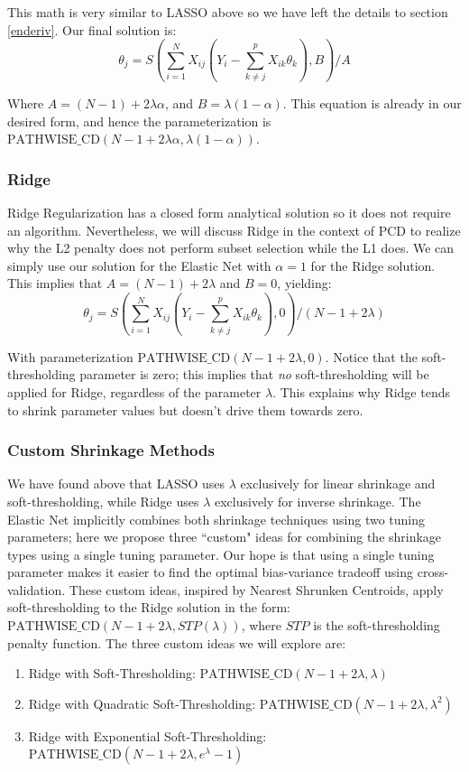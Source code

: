 \documentclass[11pt]{article}
\newcommand{\pcd}{\text{PATHWISE\_CD}}
\begin{document}
This math is very similar to LASSO above so we have left the details to section \ref{enderiv}.  Our final solution is:
	$$\theta_j = S\left(\sum\limits_{i=1}^N X_{ij}(Y_i - \sum\limits_{k \ne j}^p X_{ik}\theta_k), B\right)/A$$

Where $A=(N-1)+2\lambda\alpha$, and $B=\lambda(1-\alpha)$.  This equation is already in our desired form, and hence the parameterization is $\pcd(N-1+2\lambda\alpha,\lambda(1-\alpha))$.  

\subsubsection{Ridge}
Ridge Regularization has a closed form analytical solution so it does not require an algorithm.  Nevertheless, we will discuss Ridge in the context of PCD to realize why the L2 penalty does not perform subset selection while the L1 does.  We can simply use our solution for the Elastic Net with $\alpha=1$ for the Ridge solution.  This implies that $A=(N-1)+2\lambda$ and $B=0$, yielding:
	$$\theta_j = S\left(\sum\limits_{i=1}^N X_{ij}(Y_i - \sum\limits_{k \ne j}^p X_{ik}\theta_k), 0\right)/(N-1+2\lambda)$$

With parameterization $\pcd(N-1+2\lambda,0)$.  Notice that the soft-thresholding parameter is zero; this implies that \textit{no} soft-thresholding will be applied for Ridge, regardless of the parameter $\lambda$.  This explains why Ridge tends to shrink parameter values but doesn't drive them towards zero.  

\subsubsection{Custom Shrinkage Methods}
\label{csm}
We have found above that LASSO uses $\lambda$ exclusively for linear shrinkage and soft-thresholding, while Ridge uses $\lambda$ exclusively for inverse shrinkage.  The Elastic Net implicitly combines both shrinkage techniques using two tuning parameters; here we propose three ``custom" ideas for combining the shrinkage types using a single tuning parameter.  Our hope is that using a single tuning parameter makes it easier to find the optimal bias-variance tradeoff using cross-validation.  These custom ideas, inspired by Nearest Shrunken Centroids, apply soft-thresholding to the Ridge solution in the form: $\pcd(N-1 + 2\lambda, STP(\lambda))$, where $STP$ is the soft-thresholding penalty function.  The three custom ideas we will explore are:
\begin{enumerate}
	\item Ridge with Soft-Thresholding: $\pcd(N-1 + 2\lambda, \lambda)$
	\item Ridge with Quadratic Soft-Thresholding: $\pcd(N-1 + 2\lambda, \lambda^2)$
	\item Ridge with Exponential Soft-Thresholding: $\pcd(N-1 + 2\lambda, e^\lambda-1)$
\end{enumerate}
\end{document}
